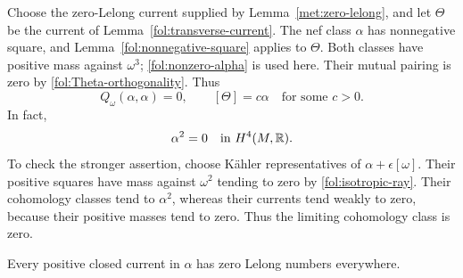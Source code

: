 Choose the zero-Lelong current supplied by
Lemma~\ref{met:zero-lelong}, and let $\Theta$ be the current of
Lemma~\ref{fol:transverse-current}.  The nef class $\alpha$ has
nonnegative square, and Lemma~\ref{fol:nonnegative-square} applies to
$\Theta$.  Both classes have positive mass against $\omega^3$;
\eqref{fol:nonzero-alpha} is used here.  Their mutual pairing is zero by
\eqref{fol:Theta-orthogonality}.  Thus
\begin{equation}\label{fol:isotropic-ray}
 Q_\omega(\alpha,\alpha)=0,\qquad [\Theta]=c\alpha
 \quad\text{for some }c>0.
\end{equation}
In fact,
\begin{equation}\label{fol:alpha-square-zero}
 \alpha^2=0\quad\text{in }H^4(M,\mathbb{R}).
\end{equation}
To check the stronger assertion, choose K\"ahler representatives of
$\alpha+\epsilon[\omega]$.  Their positive squares have mass against
$\omega^2$ tending to zero by \eqref{fol:isotropic-ray}.  Their
cohomology classes tend to $\alpha^2$, whereas their currents tend
weakly to zero, because their positive masses tend to zero.  Thus the
limiting cohomology class is zero.

\begin{lemma}\label{fol:all-zero-Lelong}
Every positive closed current in $\alpha$ has zero Lelong numbers
everywhere.
\end{lemma}

